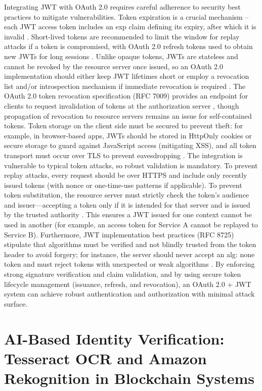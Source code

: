 \documentclass[a4paper,10pt]{report}
\begin{document}
Integrating JWT with OAuth 2.0 requires careful adherence to security best practices to mitigate vulnerabilities. Token expiration is a crucial mechanism – each JWT access token includes an exp claim defining its expiry, after which it is invalid \cite{bradley2015jwt}. Short-lived tokens are recommended to limit the window for replay attacks if a token is compromised, with OAuth 2.0 refresh tokens used to obtain new JWTs for long sessions \cite{lodderstedt2013revocation}. Unlike opaque tokens, JWTs are stateless and cannot be revoked by the resource server once issued, so an OAuth 2.0 implementation should either keep JWT lifetimes short or employ a revocation list and/or introspection mechanism if immediate revocation is required \cite{lodderstedt2013revocation}. The OAuth 2.0 token revocation specification (RFC 7009) provides an endpoint for clients to request invalidation of tokens at the authorization server \cite{lodderstedt2013revocation}, though propagation of revocation to resource servers remains an issue for self-contained tokens. Token storage on the client side must be secured to prevent theft: for example, in browser-based apps, JWTs should be stored in HttpOnly cookies or secure storage to guard against JavaScript access (mitigating XSS), and all token transport must occur over TLS to prevent eavesdropping \cite{hardt2012oauth}. The integration is vulnerable to typical token attacks, so robust validation is mandatory. To prevent replay attacks, every request should be over HTTPS and include only recently issued tokens (with nonce or one-time-use patterns if applicable). To prevent token substitution, the resource server must strictly check the token’s audience and issuer—accepting a token only if it is intended for that server and is issued by the trusted authority \cite{sheffer2020jwtbcp}. This ensures a JWT issued for one context cannot be used in another (for example, an access token for Service A cannot be replayed to Service B). Furthermore, JWT implementation best practices (RFC 8725) stipulate that algorithms must be verified and not blindly trusted from the token header to avoid forgery; for instance, the server should never accept an alg: none token and must reject tokens with unexpected or weak algorithms \cite{sheffer2020jwtbcp}. By enforcing strong signature verification and claim validation, and by using secure token lifecycle management (issuance, refresh, and revocation), an OAuth 2.0 + JWT system can achieve robust authentication and authorization with minimal attack surface.

\section{AI-Based Identity Verification: Tesseract OCR and Amazon Rekognition in Blockchain Systems}
\end{document}
